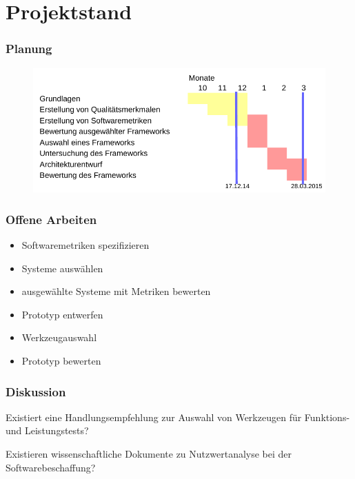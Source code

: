 \documentclass{beamer}
\begin{document}
\section{Projektstand}
\begin{frame}\frametitle{Planung}
\begin{figure}[htb]
  \begin{center}
    \includegraphics[width=1\hsize]{Plan_cropped.pdf}
  \end{center}
\end{figure}
\end{frame}


\begin{frame}\frametitle{Offene Arbeiten}
\begin{itemize}
\item Softwaremetriken spezifizieren
\item Systeme auswählen
\item ausgewählte Systeme mit Metriken bewerten
\item Prototyp entwerfen
\item Werkzeugauswahl
\item Prototyp bewerten
\end{itemize}
\end{frame}

\begin{frame}\frametitle{Diskussion}
\begin{block}{}
Existiert eine Handlungsempfehlung zur Auswahl von Werkzeugen für Funktions- und Leistungstests?
\end{block}
\vspace{\baselineskip}
\begin{block}{}
Existieren wissenschaftliche Dokumente zu Nutzwertanalyse bei der Softwarebeschaffung?
\end{block}
\vspace{\baselineskip}


\end{frame}
\end{document}
